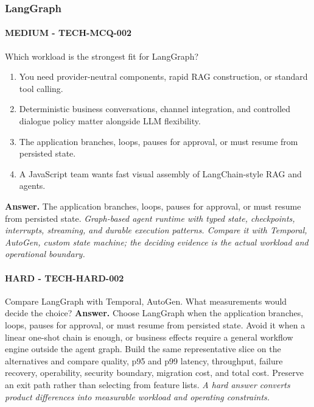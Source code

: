 \subsubsection*{LangGraph}
\paragraph{MEDIUM - TECH-MCQ-002} Which workload is the strongest fit for LangGraph?
\begin{enumerate}[label=\Alph*.]
\item You need provider-neutral components, rapid RAG construction, or standard tool calling.
\item Deterministic business conversations, channel integration, and controlled dialogue policy matter alongside LLM flexibility.
\item The application branches, loops, pauses for approval, or must resume from persisted state.
\item A JavaScript team wants fast visual assembly of LangChain-style RAG and agents.
\end{enumerate}
\textbf{Answer.} The application branches, loops, pauses for approval, or must resume from persisted state.
\textit{Graph-based agent runtime with typed state, checkpoints, interrupts, streaming, and durable execution patterns. Compare it with Temporal, AutoGen, custom state machine; the deciding evidence is the actual workload and operational boundary.}
\paragraph{HARD - TECH-HARD-002} Compare LangGraph with Temporal, AutoGen. What measurements would decide the choice?
\textbf{Answer.} Choose LangGraph when the application branches, loops, pauses for approval, or must resume from persisted state. Avoid it when a linear one-shot chain is enough, or business effects require a general workflow engine outside the agent graph. Build the same representative slice on the alternatives and compare quality, p95 and p99 latency, throughput, failure recovery, operability, security boundary, migration cost, and total cost. Preserve an exit path rather than selecting from feature lists.
\textit{A hard answer converts product differences into measurable workload and operating constraints.}
